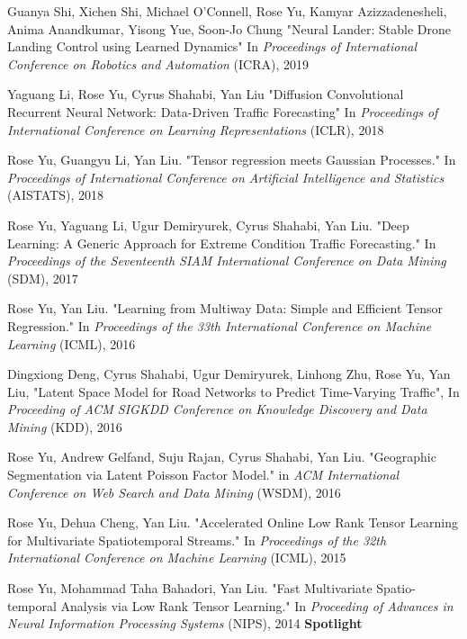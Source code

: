 \documentclass[margin,line]{res}
\begin{document}
\begin{resume}
\begin{enumerate}[label={[C\arabic*]}]
\item Guanya Shi, Xichen Shi, Michael O'Connell, Rose Yu, Kamyar Azizzadenesheli, Anima Anandkumar, Yisong Yue, Soon-Jo Chung
       "Neural Lander: Stable Drone Landing Control using Learned Dynamics" In \textit{Proceedings  of International Conference on Robotics and Automation} (ICRA), 2019

\item 	Yaguang Li,  Rose Yu, Cyrus Shahabi, Yan Liu
	"Diffusion Convolutional Recurrent Neural Network: Data-Driven Traffic Forecasting" In \textit{Proceedings  of  International Conference on Learning Representations
	}(ICLR), 2018 
	
\item  Rose Yu, Guangyu Li, Yan Liu. "Tensor regression meets Gaussian Processes." In \textit{Proceedings  of  International Conference on Artificial Intelligence and Statistics } (AISTATS), 2018 

\item Rose Yu, Yaguang Li, Ugur Demiryurek, Cyrus Shahabi, Yan Liu. "Deep Learning: A Generic Approach for Extreme Condition Traffic Forecasting." In \textit{Proceedings  of the Seventeenth SIAM International Conference on Data Mining }(SDM), 2017

\item Rose Yu, Yan Liu. "Learning from Multiway Data: Simple and Efficient Tensor Regression." In \textit{Proceedings  of the 33th International Conference on Machine Learning }(ICML),   2016

\item Dingxiong Deng, Cyrus Shahabi, Ugur Demiryurek, Linhong Zhu,  Rose Yu, Yan Liu, 
"Latent Space Model for Road Networks to Predict Time-Varying Traffic", In \textit{Proceeding of ACM SIGKDD Conference on Knowledge Discovery and Data Mining } (KDD), 2016


\item Rose Yu, Andrew Gelfand, Suju Rajan, Cyrus Shahabi, Yan Liu. "Geographic Segmentation via Latent Poisson Factor Model." in \textit{ACM International Conference on Web Search and Data Mining} (WSDM), 2016 

\item Rose Yu, Dehua Cheng, Yan Liu. "Accelerated Online Low Rank Tensor Learning for Multivariate Spatiotemporal Streams." In \textit{Proceedings  of the 32th International Conference on Machine Learning} (ICML), 2015

\item Rose Yu, Mohammad Taha Bahadori, Yan Liu. "Fast Multivariate Spatio-temporal Analysis via Low Rank Tensor Learning." In \textit{Proceeding of Advances in Neural Information Processing Systems} (NIPS), 2014 \textbf{Spotlight}


\end{enumerate}
\end{resume}
\end{document}
